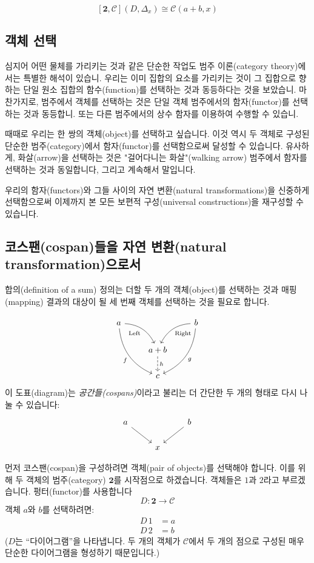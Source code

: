 \documentclass[DaoFP]{subfiles}
\begin{document}
\[ [\mathbf{2}, \mathcal{C}](D, \Delta_x)  \cong \mathcal{C}(a + b, x) \]



\subsection{객체 선택}

심지어 어떤 물체를 가리키는 것과 같은 단순한 작업도 범주 이론(category theory)에서는 특별한 해석이 있습니. 우리는 이미 집합의 요소를 가리키는 것이 그 집합으로 향하는 단일 원소 집합의 함수(function)를 선택하는 것과 동등하다는 것을 보았습니. 마찬가지로, 범주에서 객체를 선택하는 것은 단일 객체 범주에서의 함자(functor)를 선택하는 것과 동등합니. 또는 다른 범주에서의 상수 함자를 이용하여 수행할 수 있습니.

때때로 우리는 한 쌍의 객체(object)를 선택하고 싶습니다. 이것 역시 두 객체로 구성된 단순한 범주(category)에서 함자(functor)를 선택함으로써 달성할 수 있습니다. 유사하게, 화살(arrow)을 선택하는 것은 "걸어다니는 화살"(walking arrow) 범주에서 함자를 선택하는 것과 동일합니다, 그리고 계속해서 말입니다.

우리의 함자(functors)와 그들 사이의 자연 변환(natural transformations)을 신중하게 선택함으로써 이제까지 본 모든 보편적 구성(universal constructions)을 재구성할 수 있습니다.

\subsection{코스팬(cospan)들을 자연 변환(natural transformation)으로서}

합의(definition of a sum) 정의는 더할 두 개의 객체(object)를 선택하는 것과 매핑(mapping) 결과의 대상이 될 세 번째 객체를 선택하는 것을 필요로 합니다.

\[
 \begin{tikzcd}
 a
 \arrow[dr,  bend left, "\text{Left}"']
 \arrow[ddr, bend right, "f"']
 && b
 \arrow[dl, bend right, "\text{Right}"]
 \arrow[ddl, bend left, "g"]
 \\
&a + b
\arrow[d, dashed, "h"]
\\
& c
 \end{tikzcd}
\]
이 도표(diagram)는 \emph{공간들(cospans)}이라고 불리는 더 간단한 두 개의 형태로 다시 나눌 수 있습니다:
\[
 \begin{tikzcd}
 a
 \arrow[dr, ""']
 && b
 \arrow[dl, ""]
 \\
 & x
 \end{tikzcd}
\]

먼저 코스팬(cospan)을 구성하려면 객체(pair of objects)를 선택해야 합니다. 이를 위해 두 객체의 범주(category) $\mathbf{2}$를 시작점으로 하겠습니다. 객체들은 $1$과 $2$라고 부르겠습니다.
펑터(functor)를 사용합니다
\[ D \colon \mathbf{2} \to \mathcal{C}\]
객체 $a$와 $b$를 선택하려면:
\begin{align*}
D\, 1 &= a \\
D\, 2 &= b 
\end{align*}
($D$는 ``다이어그램''을 나타냅니다. 두 개의 객체가 $\mathcal{C}$에서 두 개의 점으로 구성된 매우 단순한 다이어그램을 형성하기 때문입니다.)
\end{document}

